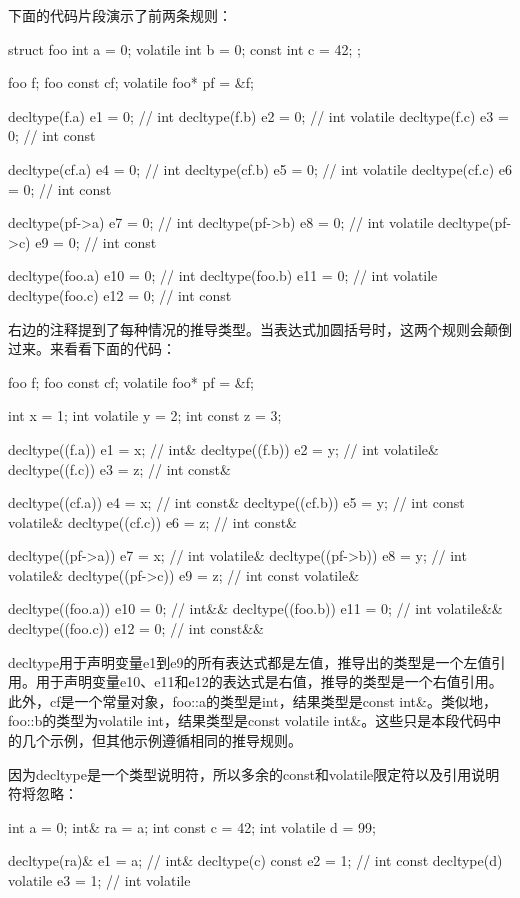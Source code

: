 下面的代码片段演示了前两条规则：

\begin{cppcode}
struct foo
{
	int a = 0;
	volatile int b = 0;
	const int c = 42;
};

foo f;
foo const cf;
volatile foo* pf = &f;

decltype(f.a) e1 = 0; // int
decltype(f.b) e2 = 0; // int volatile
decltype(f.c) e3 = 0; // int const

decltype(cf.a) e4 = 0; // int
decltype(cf.b) e5 = 0; // int volatile
decltype(cf.c) e6 = 0; // int const

decltype(pf->a) e7 = 0; // int
decltype(pf->b) e8 = 0; // int volatile
decltype(pf->c) e9 = 0; // int const

decltype(foo{}.a) e10 = 0; // int
decltype(foo{}.b) e11 = 0; // int volatile
decltype(foo{}.c) e12 = 0; // int const
\end{cppcode}

右边的注释提到了每种情况的推导类型。当表达式加圆括号时，这两个规则会颠倒过来。来看看下面的代码：

\begin{cppcode}
foo f;
foo const cf;
volatile foo* pf = &f;

int x = 1;
int volatile y = 2;
int const z = 3;

decltype((f.a)) e1 = x; // int&
decltype((f.b)) e2 = y; // int volatile&
decltype((f.c)) e3 = z; // int const&

decltype((cf.a)) e4 = x; // int const&
decltype((cf.b)) e5 = y; // int const volatile&
decltype((cf.c)) e6 = z; // int const&

decltype((pf->a)) e7 = x; // int volatile&
decltype((pf->b)) e8 = y; // int volatile&
decltype((pf->c)) e9 = z; // int const volatile&

decltype((foo{}.a)) e10 = 0; // int&&
decltype((foo{}.b)) e11 = 0; // int volatile&&
decltype((foo{}.c)) e12 = 0; // int const&&
\end{cppcode}

decltype用于声明变量e1到e9的所有表达式都是左值，推导出的类型是一个左值引用。用于声明变量e10、e11和e12的表达式是右值，推导的类型是一个右值引用。此外，cf是一个常量对象，foo::a的类型是int，结果类型是const int\&。类似地，foo::b的类型为volatile int，结果类型是const volatile int\&。这些只是本段代码中的几个示例，但其他示例遵循相同的推导规则。

因为decltype是一个类型说明符，所以多余的const和volatile限定符以及引用说明符将忽略：

\begin{cppcode}
int a = 0;
int& ra = a;
int const c = 42;
int volatile d = 99;

decltype(ra)& e1 = a; // int&
decltype(c) const e2 = 1; // int const
decltype(d) volatile e3 = 1; // int volatile
\end{cppcode}

